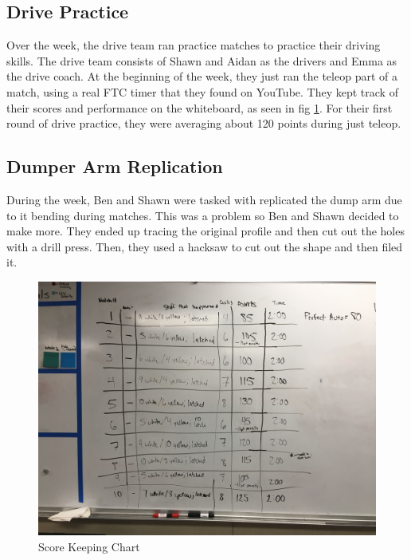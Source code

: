 \documentclass{article}
\begin{document}
\subsection{Drive Practice}
Over the week, the drive team ran practice matches to practice their driving skills. The drive team consists of Shawn and Aidan as the drivers and Emma as the drive coach. At the beginning of the week, they just ran the teleop part of a match, using a real FTC timer that they found on YouTube. They kept track of their scores and performance on the whiteboard, as seen in fig \ref{fig:chart}. For their first round of drive practice, they were averaging about 120 points during just teleop.

\subsection{Dumper Arm Replication}
During the week, Ben and Shawn were tasked with replicated the dump arm due to it bending during matches. This was a problem so Ben and Shawn decided to make more. They ended up tracing the original profile and then cut out the holes with a drill press. Then, they used a hacksaw to cut out the shape and then filed it. 

\begin{figure}
    \centering
    \includegraphics[width=.6 \textwidth]{23_02-04/images/IMG_1512.JPG}
    \caption{Score Keeping Chart}
    \label{fig:chart}
\end{figure}
\end{document}
